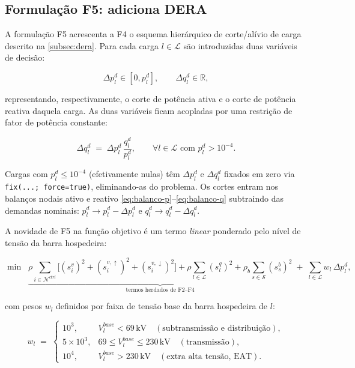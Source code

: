 \subsection{Formulação F5: adiciona DERA}
\label{subsec:f19}

A formulação F5 acrescenta a F4 o esquema hierárquico de corte/alívio de carga descrito na \autoref{subsec:dera}. Para cada carga $l \in \mathcal{L}$ são introduzidas duas variáveis de decisão:

\begin{equation}
\label{eq:dera-vars}
\Delta p^d_l \in [0, p^d_l], \qquad \Delta q^d_l \in \mathbb{R},
\end{equation}

\noindent representando, respectivamente, o corte de potência ativa e o corte de potência reativa daquela carga. As duas variáveis ficam acopladas por uma restrição de fator de potência constante:

\begin{equation}
\label{eq:dera-fp}
\Delta q^d_l \;=\; \Delta p^d_l \, \frac{q^d_l}{p^d_l}, \qquad \forall l \in \mathcal{L} \text{ com } p^d_l > 10^{-4}.
\end{equation}

\noindent Cargas com $p^d_l \le 10^{-4}$ (efetivamente nulas) têm $\Delta p^d_l$ e $\Delta q^d_l$ fixados em zero via \texttt{fix(...;\allowbreak\ force=true)}, eliminando-as do problema. Os cortes entram nos balanços nodais ativo e reativo \eqref{eq:balanco-p}--\eqref{eq:balanco-q} subtraindo das demandas nominais: $p^d_l \rightarrow p^d_l - \Delta p^d_l$ e $q^d_l \rightarrow q^d_l - \Delta q^d_l$.

A novidade de F5 na função objetivo é um termo \emph{linear} ponderado pelo nível de tensão da barra hospedeira:

\begin{equation}
\label{eq:obj-19}
\min \;\; \underbrace{\rho \!\! \sum_{i \in \mathcal{N}^{ctrl}} \!\! \big[(s^v_i)^2 + (s^{v,\uparrow}_i)^2 + (s^{v,\downarrow}_i)^2 \big] + \rho \sum_{l \in \mathcal{L}} (s^q_l)^2 + \rho_b \sum_{s \in \mathcal{S}} (s^b_s)^2}_{\text{termos herdados de F2--F4}} \;+\; \sum_{l \in \mathcal{L}} w_l \, \Delta p^d_l,
\end{equation}

\noindent com pesos $w_l$ definidos por faixa de tensão base da barra hospedeira de $l$:

\begin{equation}
\label{eq:dera-pesos}
w_l \;=\; \begin{cases}
10^3, & V^{base}_l < 69\,\text{kV} \quad (\text{subtransmissão e distribuição}), \\
5 \times 10^3, & 69 \le V^{base}_l \le 230\,\text{kV} \quad (\text{transmissão}), \\
10^4, & V^{base}_l > 230\,\text{kV} \quad (\text{extra alta tensão, EAT}).
\end{cases}
\end{equation}

